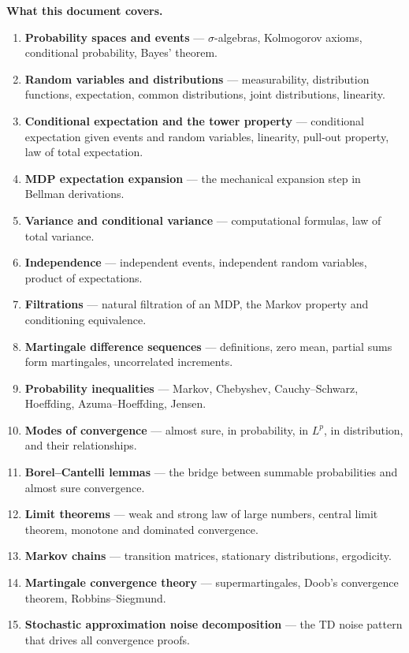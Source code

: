 \documentclass[11pt,a4paper]{article}
\theoremstyle{definition}
\theoremstyle{plain}
\theoremstyle{remark}
\begin{document}
\medskip\noindent\textbf{What this document covers.}
\begin{enumerate}[nosep]
    \item \textbf{Probability spaces and events} --- $\sigma$-algebras, Kolmogorov axioms, conditional probability, Bayes' theorem.
    \item \textbf{Random variables and distributions} --- measurability, distribution functions, expectation, common distributions, joint distributions, linearity.
    \item \textbf{Conditional expectation and the tower property} --- conditional expectation given events and random variables, linearity, pull-out property, law of total expectation.
    \item \textbf{MDP expectation expansion} --- the mechanical expansion step in Bellman derivations.
    \item \textbf{Variance and conditional variance} --- computational formulas, law of total variance.
    \item \textbf{Independence} --- independent events, independent random variables, product of expectations.
    \item \textbf{Filtrations} --- natural filtration of an MDP, the Markov property and conditioning equivalence.
    \item \textbf{Martingale difference sequences} --- definitions, zero mean, partial sums form martingales, uncorrelated increments.
    \item \textbf{Probability inequalities} --- Markov, Chebyshev, Cauchy--Schwarz, Hoeffding, Azuma--Hoeffding, Jensen.
    \item \textbf{Modes of convergence} --- almost sure, in probability, in $L^p$, in distribution, and their relationships.
    \item \textbf{Borel--Cantelli lemmas} --- the bridge between summable probabilities and almost sure convergence.
    \item \textbf{Limit theorems} --- weak and strong law of large numbers, central limit theorem, monotone and dominated convergence.
    \item \textbf{Markov chains} --- transition matrices, stationary distributions, ergodicity.
    \item \textbf{Martingale convergence theory} --- supermartingales, Doob's convergence theorem, Robbins--Siegmund.
    \item \textbf{Stochastic approximation noise decomposition} --- the TD noise pattern that drives all convergence proofs.
\end{enumerate}
\end{document}
